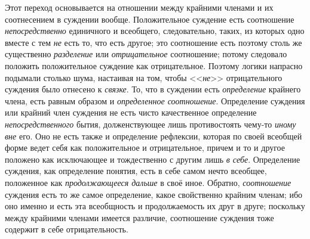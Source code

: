 Этот переход основывается на отношении между крайними членами
и их соотнесением в суждении вообще. Положительное суждение есть
соотношение {\em непосредственно}
единичного и всеобщего, следовательно, таких,
из которых одно вместе с тем {\em не}
есть то, что есть другое; это соотношение есть поэтому столь
же существенно {\em разделение}
или {\em отрицательное}
соотношение; потому следовало положить положительное суждение
как отрицательное. Поэтому логики напрасно подымали столько шума, настаивая
на том, чтобы <<{\em не}>>
отрицательного суждения было отнесено к
{\em связке}. То, что в
суждении есть {\em определение}
крайнего члена, есть равным образом и
{\em определенное соотношение}.
Определение суждения или крайний член суждения не есть чисто
качественное определение
{\em непосредственного}
бытия, долженствующее лишь противостоять чему-то
{\em иному вне} его.
Оно не есть также и определение рефлексии, которая по своей всеобщей форме
ведет себя как положительное и отрицательное, причем и то и другое положено
как исключающее и тождественно с другим лишь
{\em в себе}. Определение
суждения, как определение понятия, есть в себе самом нечто всеобщее,
положенное как {\em продолжающееся
дальше} в своё иное. Обратно,
{\em соотношение}
суждения есть то же самое определение, какое свойственно
крайним членам; ибо оно именно и есть эта всеобщность и продолжаемость их
друг в друге; поскольку между крайними членами имеется различие,
соотношение суждения тоже содержит в себе отрицательность.

